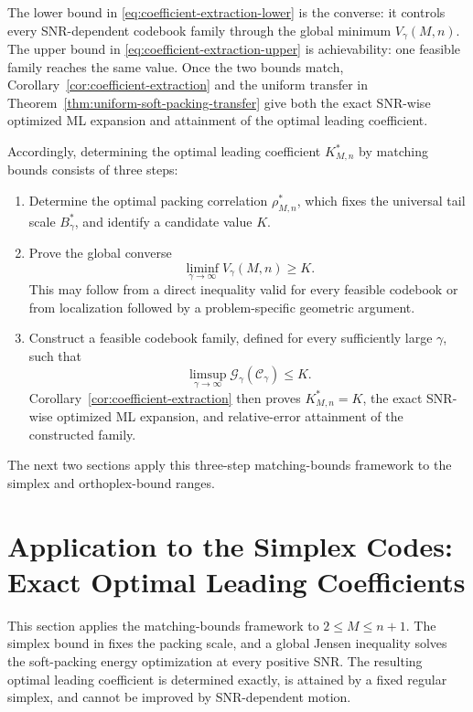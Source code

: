 \documentclass[12pt,draftclsnofoot,onecolumn]{IEEEtran}
\newcommand{\cC}{\mathcal{C}}
\newcommand{\cG}{\mathcal{G}}
\theoremstyle{definition}
\begin{document}
The lower bound in \eqref{eq:coefficient-extraction-lower} is the
converse: it controls every SNR-dependent codebook family through the
global minimum \(V_\gamma(M,n)\).  The upper bound in
\eqref{eq:coefficient-extraction-upper} is achievability: one feasible
family reaches the same value.  Once the two bounds match,
Corollary~\ref{cor:coefficient-extraction} and the uniform transfer in
Theorem~\ref{thm:uniform-soft-packing-transfer} give both the exact
SNR-wise optimized ML expansion and attainment of the optimal leading
coefficient.   

Accordingly, determining the optimal leading coefficient \(K^{\ast}_{M,n}\) by matching
bounds consists of three steps:
\begin{enumerate}
\item Determine the optimal packing correlation \(\rho^{\ast}_{M,n}\),
which fixes the universal tail scale \(B_\gamma^{\ast}\), and identify a
candidate value \(K\).

\item Prove the global converse
\begin{equation*}
  \liminf_{\gamma\to\infty}V_\gamma(M,n)\ge K.
\end{equation*}
This may follow from a direct inequality valid for every feasible
codebook or from localization followed by a problem-specific geometric
argument.

\item Construct a feasible codebook family, defined for every
sufficiently large \(\gamma\), such that
\begin{equation*}
  \limsup_{\gamma\to\infty}
  \cG_\gamma(\cC_\gamma)\le K.
\end{equation*}
Corollary~\ref{cor:coefficient-extraction} then proves
\(K^{\ast}_{M,n}=K\), the exact SNR-wise optimized ML expansion, and relative-error
attainment of the constructed family.
\end{enumerate}

The next two sections apply this three-step matching-bounds framework to
the simplex and orthoplex-bound ranges.


\section{Application to the Simplex Codes: Exact Optimal Leading Coefficients}
\label{sec:simplex-regime}

This section applies the matching-bounds framework to
\(2\leq M\leq n+1\).  The simplex bound in \cite{Rankin1955} fixes the packing scale,
and a global Jensen inequality solves the soft-packing energy optimization at
every positive SNR.  The resulting optimal leading coefficient is determined exactly, is attained by
a fixed regular simplex, and cannot be improved by SNR-dependent motion.
\end{document}
